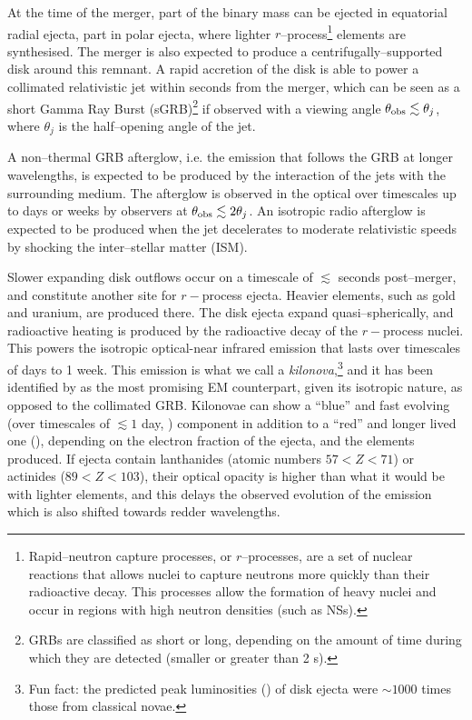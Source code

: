 At the time of the merger, part of the binary mass can be ejected in equatorial radial ejecta, part in polar ejecta, where lighter $r$--process\footnote{Rapid--neutron capture processes, or $r$--processes, are a set of nuclear reactions that allows nuclei to capture neutrons more quickly than their radioactive decay. This processes allow the formation of heavy nuclei and occur in regions with high neutron densities (such as NSs).} elements are synthesised. The merger is also expected to produce a centrifugally--supported disk around this remnant. A rapid accretion of the disk is able to power a collimated relativistic jet within seconds from the merger, which can be seen as a short Gamma Ray Burst (sGRB)\footnote{GRBs are classified as short or long, depending on the amount of time during which they are detected (smaller or greater than 2 s).} if observed with a viewing angle $\theta_{\rm obs}\lesssim\theta_j$, where $\theta_j$ is the half--opening angle of the jet. 

A non--thermal GRB afterglow, i.e. the emission that follows the GRB at longer wavelengths, is expected to be produced by the interaction of the jets with the surrounding medium. The afterglow is observed in the optical over timescales up to days or weeks by observers at $\theta_{\rm obs}\lesssim2 \theta_j$. An isotropic radio afterglow is expected to be produced when the jet decelerates to moderate relativistic speeds by shocking the inter--stellar matter (ISM).

Slower expanding disk outflows occur on a timescale of $\lesssim$ seconds post--merger, and constitute another site for $r-$process ejecta. Heavier elements, such as gold and uranium, are produced there. The disk ejecta expand quasi--spherically, and radioactive heating is produced by the radioactive decay of the $r-$process nuclei. This powers the isotropic optical-near infrared emission that lasts over timescales of days to 1 week. This emission is what we call a \emph{kilonova},\footnote{Fun fact: the predicted peak luminosities (\citealt{Metzger+10}) of disk ejecta were $\sim1000$ times those from classical novae.}  and it has been identified by \citet{EMreview} as the most promising EM counterpart, given its isotropic nature, as opposed to the collimated GRB. Kilonovae can show a ``blue''  and fast evolving (over timescales of $\lesssim 1$ day, \citealt{Metzger+10}) component in addition to a ``red'' and longer lived one (\citealt{barneskasen,Tanaka}), depending on the electron fraction of the ejecta, and the elements produced. If ejecta contain lanthanides (atomic numbers $57<Z<71$) or actinides ($89<Z<103$), their optical opacity is higher than what it would be with lighter elements, and this delays the observed evolution of the emission which is also shifted towards redder wavelengths.

